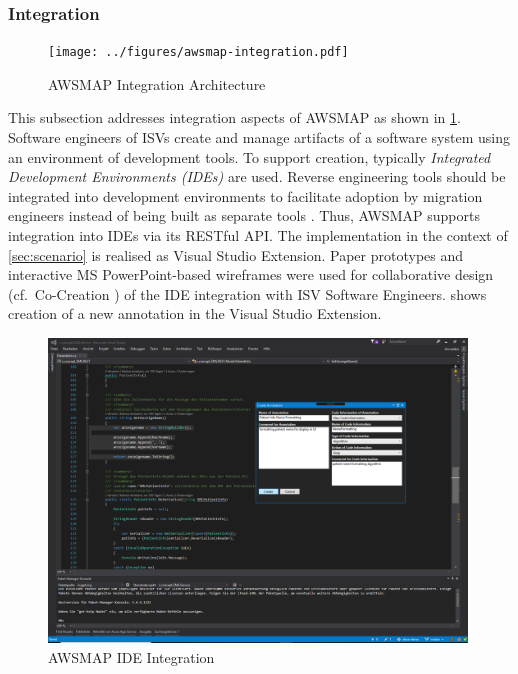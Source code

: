 \hypertarget{sec:re.impl.integration}{%
\subsubsection{Integration}\label{sec:re.impl.integration}}

\begin{figure}
\hypertarget{fig:awsmap.integration}{%
\centering
\texttt{[image: ../figures/awsmap-integration.pdf]}
\caption{AWSMAP Integration Architecture}\label{fig:awsmap.integration}
}
\end{figure}

This subsection addresses integration aspects of AWSMAP as shown in \cref{fig:awsmap.integration}.
Software engineers of ISVs create and manage artifacts of a software system using an environment of development tools.
To support creation, typically \emph{Integrated Development Environments (IDEs)} are used.
Reverse engineering tools should be integrated into development environments to facilitate adoption by migration engineers instead of being built as separate tools \autocite{Muller2000}.
Thus, AWSMAP supports integration into IDEs via its RESTful API.
The implementation in the context of \cref{sec:scenario} is realised as Visual Studio Extension.
Paper prototypes and interactive MS PowerPoint-based wireframes were used for collaborative design (cf.~Co-Creation \autocite{HCD2015}) of the IDE integration with ISV Software Engineers.
 shows creation of a new annotation in the Visual Studio Extension.

\begin{figure}
\hypertarget{fig:awsmap.ide}{%
\centering
\includegraphics[width=0.99\textwidth]{../figures/screenshots/ide-integration-hd.png}
\caption{AWSMAP IDE Integration}\label{fig:awsmap.ide}
}
\end{figure}

